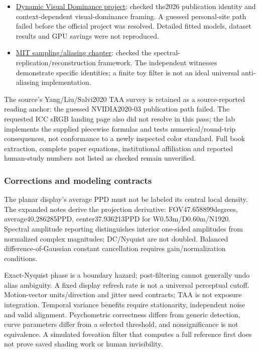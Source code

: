 \begin{itemize}
\item
  \href{https://dynamicvisualdominance.mpi-inf.mpg.de/}{Dynamic Visual Dominance project}: checked the2026 publication identity and context-dependent visual-dominance framing. A guessed personal-site path failed before the official project was resolved. Detailed fitted models, dataset results and GPU savings were not reproduced.
\item
  \href{https://visionbook.mit.edu/sampling_and_aliasing.html}{MIT sampling/aliasing chapter}: checked the spectral-replication/reconstruction framework. The independent witnesses demonstrate specific identities; a finite toy filter is not an ideal universal anti-aliasing implementation.
\end{itemize}

The source's Yang/Liu/Salvi2020 TAA survey is retained as a source-reported reading anchor: the guessed NVIDIA2020-03 publication path failed. The requested ICC sRGB landing page also did not resolve in this pass; the lab implements the supplied piecewise formulas and tests numerical/round-trip consequences, not conformance to a newly inspected color standard. Full book extraction, complete paper equations, institutional affiliation and reported human-study numbers not listed as checked remain unverified.

\subsubsection{Corrections and modeling contracts}\label{appendix-a103e7846d21-corrections-and-modeling-contracts}

\hypertarget{appendix-a103e7846d21-corrections-and-modeling-contracts}{}

The planar display's average PPD must not be labeled its central local density. The expanded notes derive the projection derivative: FOV47.658899degrees, average40.286285PPD, center37.936213PPD for W0.53m/D0.60m/N1920. Spectral amplitude reporting distinguishes interior one-sided amplitudes from normalized complex magnitudes; DC/Nyquist are not doubled. Balanced difference-of-Gaussian constant cancellation requires gain/normalization conditions.

Exact-Nyquist phase is a boundary hazard; post-filtering cannot generally undo alias ambiguity. A fixed display refresh rate is not a universal perceptual cutoff. Motion-vector units/direction and jitter need contracts; TAA is not exposure integration. Temporal variance benefits require stationarity, independent noise and valid alignment. Psychometric correctness differs from generic detection, curve parameters differ from a selected threshold, and nonsignificance is not equivalence. A simulated foveation filter that computes a full reference first does not prove saved shading work or human invisibility.

